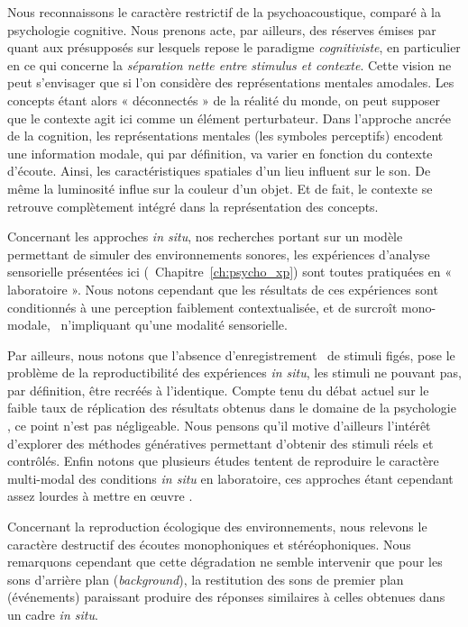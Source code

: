 Nous reconnaissons le caractère restrictif de la psychoacoustique, comparé à la psychologie cognitive. Nous prenons acte, par ailleurs, des réserves émises par \cite{maffiolo_caracterisation_1999} quant aux présupposés sur lesquels repose le paradigme \emph{cognitiviste}, en particulier en ce qui concerne la \emph{séparation nette entre stimulus et contexte}. Cette vision ne peut s'envisager que si l'on considère des représentations mentales amodales. Les concepts étant alors « déconnectés » de la réalité du monde, on peut supposer que le contexte agit ici comme un élément perturbateur. Dans l'approche ancrée de la cognition, les représentations mentales (les symboles perceptifs) encodent une information modale, qui par définition, va varier en fonction du contexte d'écoute. Ainsi, les caractéristiques spatiales d'un lieu influent sur le son. De même la luminosité influe sur la couleur d'un objet. Et de fait, le contexte se retrouve complètement intégré dans la représentation des concepts.

Concernant les approches \emph{in situ}, nos recherches portant sur un modèle permettant de simuler des environnements sonores, les expériences d'analyse sensorielle présentées ici (\cf~Chapitre~\ref{ch:psycho_xp}) sont toutes pratiquées en « laboratoire ». Nous notons cependant que les résultats de ces expériences sont conditionnés à une perception faiblement contextualisée, et de surcroît mono-modale, \ie~n'impliquant qu'une modalité sensorielle.

Par ailleurs, nous notons que l'absence d'enregistrement \ie~de stimuli figés, pose le problème de la reproductibilité des expériences \emph{in situ}, les stimuli ne pouvant pas, par définition, être recréés à l'identique. Compte tenu du débat actuel sur le faible taux de réplication des résultats obtenus dans le domaine de la psychologie \citep{spellman2015short}, ce point n'est pas négligeable. Nous pensons qu'il motive d'ailleurs l'intérêt d'explorer des méthodes génératives permettant d'obtenir des stimuli réels et contrôlés. Enfin notons que plusieurs études tentent de reproduire le caractère multi-modal des conditions \emph{in situ} en laboratoire, ces approches étant cependant assez lourdes à mettre en œuvre \citep{woloszyn1997vers,morel2016noise}.

Concernant la reproduction écologique des environnements, nous relevons le caractère destructif des écoutes monophoniques et stéréophoniques. Nous remarquons cependant que cette dégradation ne semble intervenir que pour les sons d'arrière plan (\emph{background}), la restitution des sons de premier plan (événements) paraissant produire des réponses similaires à celles obtenues dans un cadre \emph{in situ}.

